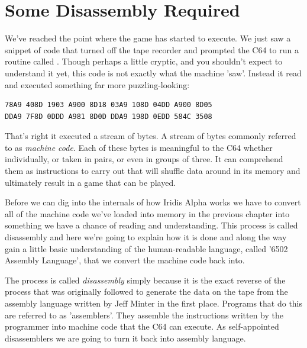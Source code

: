 \chapter{Some Disassembly Required} 
\label{sec:disassembly}
\lstset{style=6502Style}

We've reached the point where the game has started to execute. We just saw a
snippet of code that turned off the tape recorder and prompted the C64 to run a
routine called .
Though perhaps a little cryptic, and you shouldn't expect to understand it yet,
this code is not exactly what the machine 'saw'. Instead it read and executed
something far more puzzling-looking:


\begin{lstlisting}[caption=The first piece of machine code that is executed in Iridis Alpha.,escapechar=\%]
78A9 408D 1903 A900 8D18 03A9 108D 04DD A900 8D05
DDA9 7F8D 0DDD A981 8D0D DDA9 198D 0EDD 584C 3508 
\end{lstlisting}

That's right it executed a stream of bytes. A stream of bytes commonly referred to as \textit{machine code}. Each of these
bytes is meaningful to the C64 whether individually, or taken in pairs, or even in groups of three. It can comprehend them
as instructions to carry out that will shuffle data around in its memory and ultimately result in a game that
can be played.

Before we can dig into the internals of how Iridis Alpha works we have to convert all of the machine code we've
loaded into memory in the previous chapter into something we have a chance of reading and understanding. This
process is called disassembly and here we're going to explain how it is done and along the way gain a little
basic understanding of the human-readable language, called '6502 Assembly Language', that we convert the machine
code back into.

The process is called \textit{disassembly} simply because it is the exact reverse of the process that was originally followed
to generate the data on the tape from the assembly language written by Jeff Minter in the first place. Programs that
do this are referred to as 'assemblers'. They assemble the instructions written by the programmer into machine code
that the C64 can execute. As self-appointed disassemblers we are going to turn it back into assembly language.

